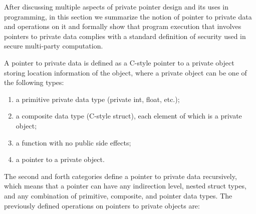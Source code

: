 \documentclass[11pt]{article}
\begin{document}
After discussing multiple aspects of private pointer design and its uses in
programming, in this section we summarize the notion of pointer to private
data and operations on it and formally show that program execution that
involves pointers to private data complies with a standard definition of
security used in secure multi-party computation. 

A pointer to private data is defined as a C-style pointer to a private
object storing location information of the object, where a private object
can be one of the following types:
\begin{enumerate}
  \item a primitive private data type (private int, float, etc.);
  \item a composite data type (C-style struct), each element of which is a
    private object;
  \item a function with no public side effects;
  \item a pointer to a private object.
\end{enumerate}
The second and forth categories define a pointer to private data
recursively, which means that a pointer can have any indirection level,
nested struct types, and any combination of primitive, composite, and
pointer data types. 
The previously defined operations on pointers to private objects are:
\end{document}
